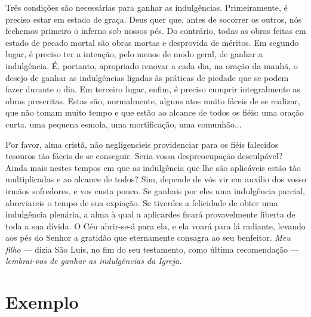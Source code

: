 Três condições são necessárias para ganhar as indulgências. Primeiramente, é preciso estar em estado de graça. Deus quer que, antes de socorrer os outros, nós fechemos primeiro o inferno sob nossos pés. Do contrário, todas as obras feitas em estado de pecado mortal são obras mortas e desprovida de méritos. Em segundo lugar, é preciso ter a intenção, pelo menos de modo geral, de ganhar a indulgência. É, portanto, apropriado renovar a cada dia, na oração da manhã, o desejo de ganhar as indulgências ligadas às práticas de piedade que se podem fazer durante o dia. Em terceiro lugar, enfim, é preciso cumprir integralmente as obras prescritas. Estas são, normalmente, alguns atos muito fáceis de se realizar, que não tomam muito tempo e que estão ao alcance de todos os fiéis: uma oração curta, uma pequena esmola, uma mortificação, uma comunhão...

Por favor, alma cristã, não negligencieis providenciar para os fiéis falecidos tesouros tão fáceis de se conseguir. Seria vossa despreocupação desculpável? Ainda mais nestes tempos em que as indulgência que lhe são aplicáveis estão tão multiplicadas e ao alcance de todos? Sim, depende de vós vir em auxílio dos vosso irmãos sofredores, e vos custa pouco. Se ganhais por eles uma indulgência parcial, abreviareis o tempo de sua expiação. Se tiverdes a felicidade de obter uma indulgência plenária, a alma à qual a aplicardes ficará provavelmente liberta de toda a sua dívida. O Céu abrir-se-á para ela, e ela voará para lá radiante, levando aos pés do Senhor a gratidão que eternamente consagra ao seu benfeitor. \textit{Meu filho} --- dizia São Luís, no fim do seu testamento, como última recomendação --- \textit{lembrai-vos de ganhar as indulgências da Igreja.}


\section*{Exemplo}

